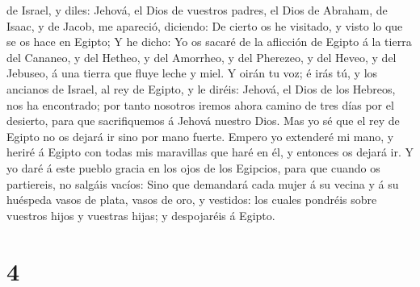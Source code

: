 de Israel, y diles: Jehová, el Dios de vuestros padres, el Dios de
Abraham, de Isaac, y de Jacob, me apareció, diciendo: De cierto os he
visitado, y visto lo que se os hace en Egipto;  Y he
dicho: Yo os sacaré de la aflicción de Egipto á la tierra del Cananeo, y
del Hetheo, y del Amorrheo, y del Pherezeo, y del Heveo, y del Jebuseo,
á una tierra que fluye leche y miel.  Y oirán tu voz; é
irás tú, y los ancianos de Israel, al rey de Egipto, y le diréis:
Jehová, el Dios de los Hebreos, nos ha encontrado; por tanto nosotros
iremos ahora camino de tres días por el desierto, para que sacrifiquemos
á Jehová nuestro Dios.  Mas yo sé que el rey de Egipto no
os dejará ir sino por mano fuerte.  Empero yo extenderé
mi mano, y heriré á Egipto con todas mis maravillas que haré en él, y
entonces os dejará ir.  Y yo daré á este pueblo gracia en
los ojos de los Egipcios, para que cuando os partiereis, no salgáis
vacíos:  Sino que demandará cada mujer á su vecina y á su
huéspeda vasos de plata, vasos de oro, y vestidos: los cuales pondréis
sobre vuestros hijos y vuestras hijas; y despojaréis á Egipto.

\hypertarget{section-3}{%
\section{4}\label{section-3}}

